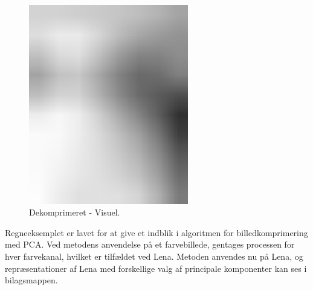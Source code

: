 \begin{figure}[!h]
\begin{minipage}[b]{0.27\linewidth}
\centering
\includegraphics[width=0.62\textwidth]{Billeder/LenaAnvendelse/testBillede/testBillede2.png}
\caption{Dekomprimeret - Visuel.}
\label{fig:X_anvendelse-tal-slut}
\end{minipage}
\hspace{0.5cm}
\end{figure}

Regneeksemplet er lavet for at give et indblik i algoritmen for billedkomprimering med PCA. Ved metodens anvendelse på et farvebillede, gentages processen for hver farvekanal, hvilket er tilfældet ved Lena.
Metoden anvendes nu på Lena, og repræsentationer af Lena med forskellige valg af principale komponenter kan ses i bilagsmappen.